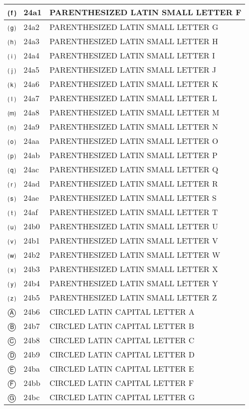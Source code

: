 \documentclass[12pt,letterpaper,openany]{book}
\begin{document}
\begin{center}
\begin{supertabular}{|m{0.25in}|m{0.5in}|m{4in}|}
⒡ & 24a1 & PARENTHESIZED LATIN SMALL LETTER F\\\hline
⒢ & 24a2 & PARENTHESIZED LATIN SMALL LETTER G\\\hline
⒣ & 24a3 & PARENTHESIZED LATIN SMALL LETTER H\\\hline
⒤ & 24a4 & PARENTHESIZED LATIN SMALL LETTER I\\\hline
⒥ & 24a5 & PARENTHESIZED LATIN SMALL LETTER J\\\hline
⒦ & 24a6 & PARENTHESIZED LATIN SMALL LETTER K\\\hline
⒧ & 24a7 & PARENTHESIZED LATIN SMALL LETTER L\\\hline
⒨ & 24a8 & PARENTHESIZED LATIN SMALL LETTER M\\\hline
⒩ & 24a9 & PARENTHESIZED LATIN SMALL LETTER N\\\hline
⒪ & 24aa & PARENTHESIZED LATIN SMALL LETTER O\\\hline
⒫ & 24ab & PARENTHESIZED LATIN SMALL LETTER P\\\hline
⒬ & 24ac & PARENTHESIZED LATIN SMALL LETTER Q\\\hline
⒭ & 24ad & PARENTHESIZED LATIN SMALL LETTER R\\\hline
⒮ & 24ae & PARENTHESIZED LATIN SMALL LETTER S\\\hline
⒯ & 24af & PARENTHESIZED LATIN SMALL LETTER T\\\hline
⒰ & 24b0 & PARENTHESIZED LATIN SMALL LETTER U\\\hline
⒱ & 24b1 & PARENTHESIZED LATIN SMALL LETTER V\\\hline
⒲ & 24b2 & PARENTHESIZED LATIN SMALL LETTER W\\\hline
⒳ & 24b3 & PARENTHESIZED LATIN SMALL LETTER X\\\hline
⒴ & 24b4 & PARENTHESIZED LATIN SMALL LETTER Y\\\hline
⒵ & 24b5 & PARENTHESIZED LATIN SMALL LETTER Z\\\hline
Ⓐ & 24b6 & CIRCLED LATIN CAPITAL LETTER A\\\hline
Ⓑ & 24b7 & CIRCLED LATIN CAPITAL LETTER B\\\hline
Ⓒ & 24b8 & CIRCLED LATIN CAPITAL LETTER C\\\hline
Ⓓ & 24b9 & CIRCLED LATIN CAPITAL LETTER D\\\hline
Ⓔ & 24ba & CIRCLED LATIN CAPITAL LETTER E\\\hline
Ⓕ & 24bb & CIRCLED LATIN CAPITAL LETTER F\\\hline
Ⓖ & 24bc & CIRCLED LATIN CAPITAL LETTER G\\\hline

\end{supertabular}
\end{center}
\end{document}

